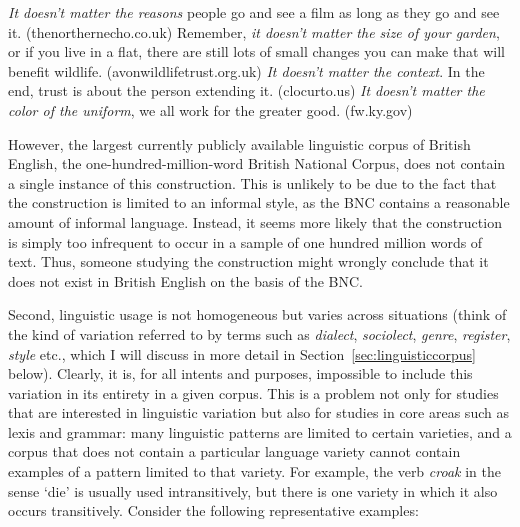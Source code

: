 \begin{exe}
\ex
\begin{xlist}
\label{ex:doesntmattertheN}
\ex \textit{It doesn't matter the reasons} people go and see a film as long as they go and see it. (thenorthernecho.co.uk)
\ex Remember, \textit{it doesn't matter the size of your garden}, or if you live in a flat, there are still lots of small changes you can make that will benefit wildlife. (avonwildlifetrust.org.uk)
\ex \textit{It doesn't matter the context}. In the end, trust is about the person extending it. (clocurto.us)
\ex \textit{It doesn't matter the color of the uniform}, we all work for the greater good. (fw.ky.gov)
\end{xlist}
\end{exe}

However, the largest  currently publicly available linguistic corpus of British  English, the one\hyp{}hundred\hyp{}million\hyp{}word British National Corpus, does not contain a single instance of this construction. This is unlikely to be due to the fact that the construction is limited to an informal style,  as the BNC  contains a reasonable amount of informal language. Instead, it seems more likely that the construction is simply too infrequent to occur in a sample  of one hundred million words of text. Thus, someone studying the construction might wrongly conclude that it does not exist in British English on the basis of the  BNC.

Second, linguistic usage is not homogeneous but varies across situations (think of the kind of variation  referred to by terms such as \emph{dialect}, \emph{sociolect}, \emph{genre},  \emph{register},  \emph{style}  etc., which I will discuss in more detail in Section~\ref{sec:linguisticcorpus} below). Clearly, it is, for all intents and purposes, impossible to include this variation  in its entirety in a given corpus. This is a problem not only for studies that are interested in linguistic variation but also for studies in core areas such as lexis and grammar:  many linguistic patterns are limited to certain varieties, and a corpus that does not contain a particular language variety  cannot contain examples of a pattern limited to that variety. For example, the verb  \textit{croak} in the sense `die' is usually used intransitively, but there is one variety in which it also occurs transitively.  Consider the following representative examples:

